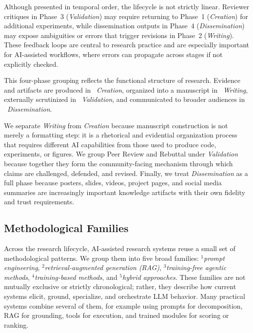 


\vspace{16pt}
Although presented in temporal order, the lifecycle is not strictly linear. Reviewer critiques in Phase~3 (\emph{Validation}) may require returning to Phase~1 (\emph{Creation}) for additional experiments, while dissemination outputs in Phase~4 (\emph{Dissemination}) may expose ambiguities or errors that trigger revisions in Phase~2 (\emph{Writing}). These feedback loops are central to research practice and are especially important for AI-assisted workflows, where errors can propagate across stages if not explicitly checked.

This four-phase grouping reflects the functional structure of research. Evidence and artifacts are produced in ~\emph{Creation}, organized into a manuscript in ~\emph{Writing}, externally scrutinized in ~\emph{Validation}, and communicated to broader audiences in ~\emph{Dissemination}. 

We separate \emph{Writing} from \emph{Creation} because manuscript construction is not merely a formatting step: it is a rhetorical and evidential organization process that requires different AI capabilities from those used to produce code, experiments, or figures. We group Peer Review and Rebuttal under \emph{Validation} because together they form the community-facing mechanism through which claims are challenged, defended, and revised. Finally, we treat \emph{Dissemination} as a full phase because posters, slides, videos, project pages, and social media summaries are increasingly important knowledge artifacts with their own fidelity and trust requirements.



\subsection{Methodological Families}
\label{sec:methods_overview}

Across the research lifecycle, AI-assisted research systems reuse a small set of methodological patterns. We group them into five broad families: $^1$\emph{prompt engineering}, $^2$\emph{retrieval-augmented generation (RAG)}, $^3$\emph{training-free agentic methods}, $^4$\emph{training-based methods}, and $^5$\emph{hybrid approaches}. These families are not mutually exclusive or strictly chronological; rather, they describe how current systems elicit, ground, specialize, and orchestrate LLM behavior. Many practical systems combine several of them, for example using prompts for decomposition, RAG for grounding, tools for execution, and trained modules for scoring or ranking.

